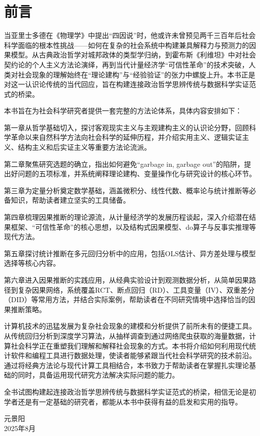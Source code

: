 \chapter*{前言}

当亚里士多德在《物理学》中提出``四因说''时，他或许未曾预见两千三百年后社会科学面临的根本性挑战——如何在复杂的社会系统中构建兼具解释力与预测力的因果模型。从古典政治哲学对城邦政体的类型学归纳，到霍布斯《利维坦》中对社会契约论的个人主义方法论演绎，再到当代计量经济学``可信性革命''的技术突破，人类对社会现象的理解始终在``理论建构''与``经验验证''的张力中螺旋上升。本书正是对这一认识论传统的当代回应，旨在构建连接政治哲学思辨传统与数据科学实证范式的桥梁。

本书旨在为社会科学研究者提供一套完整的方法论体系，具体内容安排如下：

\begin{itemize}
    {\fangsong \item 第一章从哲学基础切入，探讨客观现实主义与主观建构主义的认识论分野，回顾科学革命以来自然科学方法向社会科学的延伸历程，并介绍实用主义、逻辑实证主义、结构主义和后实证主义等重要方法论流派。
    
    \item 第二章聚焦研究选题的确立，指出如何避免``garbage in, garbage out''的陷阱，提出好问题的五项标准，并系统阐释理论建构、变量操作化与研究设计的核心环节。
    
    \item 第三章为定量分析奠定数学基础，涵盖微积分、线性代数、概率论与统计推断等必备知识，帮助读者建立坚实的工具储备。
    
    \item 第四章梳理因果推断的理论源流，从计量经济学的发展历程谈起，深入介绍潜在结果框架、``可信性革命''的核心思想，以及结构式因果模型、do算子与反事实推理等现代方法。
    
    \item 第五章探讨统计推断在多元回归分析中的应用，包括OLS估计、异方差处理与模型选择等核心内容。
    
    \item 第六章进入因果推断的实践应用，从经典实验设计到观测数据分析，从简单因果路径到复杂因果网络，系统覆盖RCT、断点回归（RD）、工具变量（IV）、双重差分（DID）等常用方法，并结合实际案例，帮助读者在不同研究情境中选择恰当的因果推断策略。}
\end{itemize}

计算机技术的迅猛发展为复杂社会现象的建模和分析提供了前所未有的便捷工具。从传统回归分析到深度学习算法，从抽样调查到通过网络爬虫获取的海量数据，计算社会科学正在重塑我们理解和解释社会现象的方式。本书将介绍如何利用现代统计软件和编程工具进行数据处理，使读者能够紧跟当代社会科学研究的技术前沿。通过将经典方法论与现代计算工具相结合，本书致力于帮助读者在掌握扎实理论基础的同时，具备运用现代研究方法解决实际问题的能力。

全书试图构建起连接政治哲学思辨传统与数据科学实证范式的桥梁，相信无论是初学者还是有一定基础的研究者，都能从本书中获得有益的启发和实用的指导。

\begin{flushright}
元景阳 \\
2025年8月
\end{flushright}

\newpage